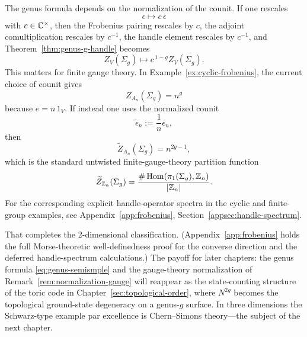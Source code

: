 \begin{remark}\label{rem:normalization-gauge}
The genus formula depends on the normalization of the counit. If one rescales
\begin{equation}\label{eq:counit-rescale}
\epsilon \longmapsto c\,\epsilon
\end{equation}
with $c \in \mathbb{C}^\times$, then the Frobenius pairing rescales by $c$, the adjoint comultiplication rescales by $c^{-1}$, the handle element rescales by $c^{-1}$, and Theorem~\ref{thm:genus-g-handle} becomes
\begin{equation}\label{eq:rescaled-genus}
Z_V(\Sigma_g) \longmapsto c^{\,1-g} Z_V(\Sigma_g).
\end{equation}
This matters for finite gauge theory. In Example~\ref{ex:cyclic-frobenius}, the current choice of counit gives
\begin{equation}\label{eq:An-genus-unnormalized}
Z_{A_n}(\Sigma_g)=n^g
\end{equation}
because $e=n\,1_V$. If instead one uses the normalized counit
\begin{equation}\label{eq:An-normalized-counit}
\widetilde{\epsilon}_n := \frac{1}{n}\epsilon_n,
\end{equation}
then
\begin{equation}\label{eq:An-genus-normalized}
\widetilde{Z}_{A_n}(\Sigma_g)=n^{2g-1},
\end{equation}
which is the standard untwisted finite-gauge-theory partition function
\begin{equation}\label{eq:Zn-finite-gauge}
\widetilde{Z}_{\mathbb{Z}_n}(\Sigma_g)=\frac{\#\operatorname{Hom}(\pi_1(\Sigma_g),\mathbb{Z}_n)}{|\mathbb{Z}_n|}.
\end{equation}
For the corresponding explicit handle-operator spectra in the cyclic and finite-group examples, see Appendix~\ref{app:frobenius}, Section~\ref{appsec:handle-spectrum}.
\end{remark}

\medskip

\noindent That completes the 2-dimensional classification.  (Appendix~\ref{app:frobenius} holds the full Morse-theoretic well-definedness proof for the converse direction and the deferred handle-spectrum calculations.)  The payoff for later chapters: the genus formula \eqref{eq:genus-semismple} and the gauge-theory normalization of Remark~\ref{rem:normalization-gauge} will reappear as the state-counting structure of the toric code in Chapter~\ref{sec:topological-order}, where $N^{2g}$ becomes the topological ground-state degeneracy on a genus-$g$ surface.  In three dimensions the Schwarz-type example par excellence is Chern--Simons theory---the subject of the next chapter.
